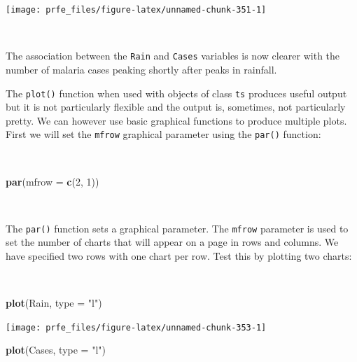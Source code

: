 \documentclass[12pt,a4paper]{book}
\newenvironment{Shaded}{\begin{snugshade}}{\end{snugshade}}
\newcommand{\DataTypeTok}[1]{\textcolor[rgb]{0.13,0.29,0.53}{#1}}
\newcommand{\DecValTok}[1]{\textcolor[rgb]{0.00,0.00,0.81}{#1}}
\newcommand{\KeywordTok}[1]{\textcolor[rgb]{0.13,0.29,0.53}{\textbf{#1}}}
\newcommand{\NormalTok}[1]{#1}
\newcommand{\StringTok}[1]{\textcolor[rgb]{0.31,0.60,0.02}{#1}}
\theoremstyle{definition}
\theoremstyle{definition}
\theoremstyle{definition}
\theoremstyle{remark}
\begin{document}
\begin{center}\texttt{[image: prfe\_files/figure-latex/unnamed-chunk-351-1]} \end{center}

~

The association between the \texttt{Rain} and \texttt{Cases} variables
is now clearer with the number of malaria cases peaking shortly after
peaks in rainfall.

The \texttt{plot()} function when used with objects of class \texttt{ts}
produces useful output but it is not particularly flexible and the
output is, sometimes, not particularly pretty. We can however use basic
graphical functions to produce multiple plots. First we will set the
\texttt{mfrow} graphical parameter using the \texttt{par()} function:

~

\begin{Shaded}
\begin{Highlighting}[]
\KeywordTok{par}\NormalTok{(}\DataTypeTok{mfrow =} \KeywordTok{c}\NormalTok{(}\DecValTok{2}\NormalTok{, }\DecValTok{1}\NormalTok{))}
\end{Highlighting}
\end{Shaded}

~

The \texttt{par()} function sets a graphical parameter. The
\texttt{mfrow} parameter is used to set the number of charts that will
appear on a page in rows and columns. We have specified two rows with
one chart per row. Test this by plotting two charts:

~

\begin{Shaded}
\begin{Highlighting}[]
\KeywordTok{plot}\NormalTok{(Rain, }\DataTypeTok{type =} \StringTok{"l"}\NormalTok{)}
\end{Highlighting}
\end{Shaded}

\begin{center}\texttt{[image: prfe\_files/figure-latex/unnamed-chunk-353-1]} \end{center}

\begin{Shaded}
\begin{Highlighting}[]
\KeywordTok{plot}\NormalTok{(Cases, }\DataTypeTok{type =} \StringTok{"l"}\NormalTok{)}
\end{Highlighting}
\end{Shaded}
\end{document}
